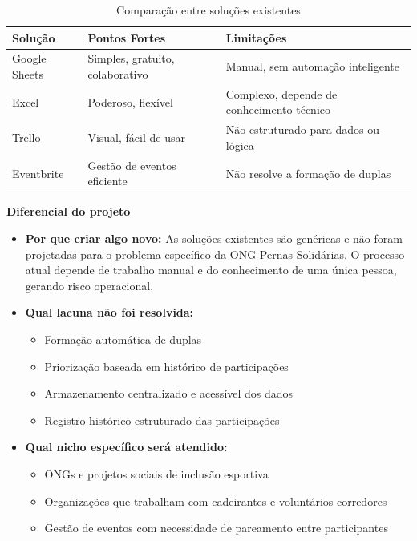 \documentclass[12pt,a4paper]{article}
\begin{document}
\begin{table}[H]
    \centering
    \caption{Comparação entre soluções existentes}
    \label{tab:benchmark}
    \begin{tabular}{|L{3cm}|L{5cm}|L{5cm}|}
        \hline
        \textbf{Solução} & \textbf{Pontos Fortes} & \textbf{Limitações} \\ \hline
        Google Sheets & Simples, gratuito, colaborativo        & Manual, sem automação inteligente         \\ \hline
        Excel         & Poderoso, flexível                     & Complexo, depende de conhecimento técnico \\ \hline
        Trello        & Visual, fácil de usar                  & Não estruturado para dados ou lógica      \\ \hline
        Eventbrite    & Gestão de eventos eficiente            & Não resolve a formação de duplas          \\ \hline
    \end{tabular}
\end{table}

\textbf{Diferencial do projeto}
\begin{itemize}
    \item \textbf{Por que criar algo novo:} As soluções existentes são genéricas e não
    foram projetadas para o problema específico da ONG Pernas Solidárias. O processo
    atual depende de trabalho manual e do conhecimento de uma única pessoa, gerando
    risco operacional.

    \item \textbf{Qual lacuna não foi resolvida:}
    \begin{itemize}
        \item Formação automática de duplas
        \item Priorização baseada em histórico de participações
        \item Armazenamento centralizado e acessível dos dados
        \item Registro histórico estruturado das participações
    \end{itemize}

    \item \textbf{Qual nicho específico será atendido:}
    \begin{itemize}
        \item ONGs e projetos sociais de inclusão esportiva
        \item Organizações que trabalham com cadeirantes e voluntários corredores
        \item Gestão de eventos com necessidade de pareamento entre participantes
    \end{itemize}
\end{itemize}
\end{document}
